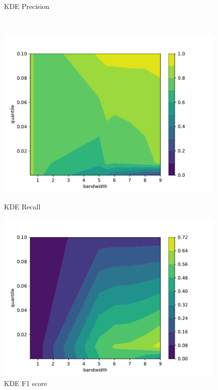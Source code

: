 \begin{figure}[!htb]
\begin{minipage}[t]{0.5\textwidth}
        \caption{KDE Precision}
    \end{minipage}
    \\
    \begin{minipage}[t]{0.5\textwidth}
        \vspace{0pt}
        \includegraphics[width=\textwidth]{images/kde-recall.pdf}
        \caption{KDE Recall}
    \end{minipage}
    \hfill
    \begin{minipage}[t]{0.5\textwidth}
        \vspace{0pt}
        \includegraphics[width=\textwidth]{images/kde-f1.pdf}
        \caption{KDE F1 score}
    \end{minipage}
\end{figure}

